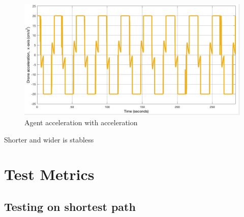 \begin{figure}[H]
  \centering
  \includegraphics[width=1\columnwidth]{figures/SA_accel_post_final_adjustment}
  \caption{\label{fig:post_limit}Agent acceleration with acceleration}
\end{figure}

Shorter and wider is stabless

\section{Test Metrics}
\label{sec:test_metrics}

\subsection{Testing on shortest path}



